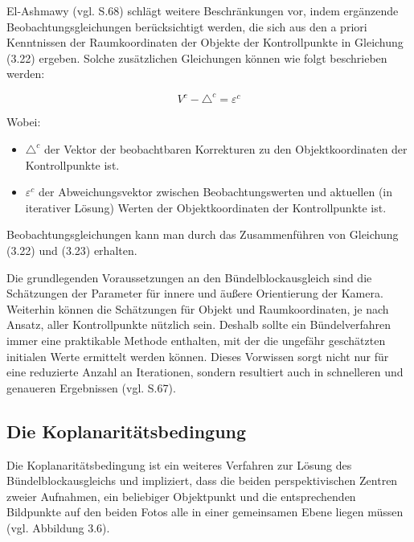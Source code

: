 El-Ashmawy (vgl. \cite{comparative_conditions_study} S.68) schlägt weitere Beschränkungen vor, indem ergänzende Beobachtungsgleichungen berücksichtigt werden, die sich aus den a priori Kenntnissen der Raumkoordinaten der Objekte der Kontrollpunkte in Gleichung (3.22) ergeben. Solche zusätzlichen Gleichungen können wie folgt beschrieben werden:

\begin{equation}
V^c-\triangle^c = \varepsilon^c
\end{equation}

Wobei:

\begin{itemize}
\item $\triangle^c$ der Vektor der beobachtbaren Korrekturen zu den Objektkoordinaten der Kontrollpunkte ist.

\item $\varepsilon^c$ der Abweichungsvektor zwischen Beobachtungswerten und aktuellen (in iterativer Lösung) Werten der Objektkoordinaten der Kontrollpunkte ist.

\end{itemize}

Beobachtungsgleichungen kann man durch das Zusammenführen von Gleichung (3.22) und (3.23) erhalten. 

Die grundlegenden Voraussetzungen an den Bündelblockausgleich sind die Schätzungen der Parameter für innere und äußere Orientierung der Kamera. Weiterhin können die Schätzungen für Objekt und Raumkoordinaten, je nach Ansatz, aller Kontrollpunkte nützlich sein. Deshalb sollte ein Bündelverfahren immer eine praktikable Methode enthalten, mit der die ungefähr geschätzten initialen Werte ermittelt werden können. Dieses Vorwissen sorgt nicht nur für eine reduzierte Anzahl an Iterationen, sondern resultiert auch in schnelleren und genaueren Ergebnissen (vgl. \cite{comparative_conditions_study} S.67).


\subsection{Die Koplanaritätsbedingung}

Die Koplanaritätsbedingung ist ein weiteres Verfahren zur Lösung des Bündelblockausgleichs und impliziert, dass die beiden perspektivischen Zentren zweier Aufnahmen, ein beliebiger Objektpunkt und die entsprechenden Bildpunkte auf den beiden Fotos alle in einer gemeinsamen Ebene liegen müssen (vgl. Abbildung 3.6). 

